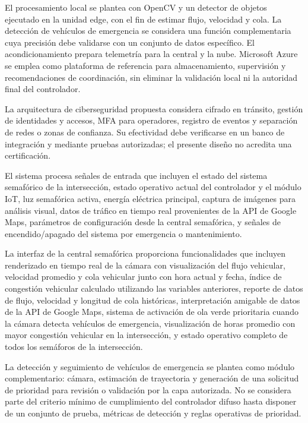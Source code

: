 \documentclass[12pt,a4paper,oneside]{report}
\begin{document}
El procesamiento local se plantea con OpenCV y un detector de objetos ejecutado en la unidad edge, con el fin de estimar flujo, velocidad y cola. La detección de vehículos de emergencia se considera una función complementaria cuya precisión debe validarse con un conjunto de datos específico. El acondicionamiento prepara telemetría para la central y la nube. Microsoft Azure se emplea como plataforma de referencia para almacenamiento, supervisión y recomendaciones de coordinación, sin eliminar la validación local ni la autoridad final del controlador.

La arquitectura de ciberseguridad propuesta considera cifrado en tránsito, gestión de identidades y accesos, MFA para operadores, registro de eventos y separación de redes o zonas de confianza. Su efectividad debe verificarse en un banco de integración y mediante pruebas autorizadas; el presente diseño no acredita una certificación.

El sistema procesa señales de entrada que incluyen el estado del sistema semafórico de la intersección, estado operativo actual del controlador y el módulo IoT, luz semafórica activa, energía eléctrica principal, captura de imágenes para análisis visual, datos de tráfico en tiempo real provenientes de la API de Google Maps, parámetros de configuración desde la central semafórica, y señales de encendido/apagado del sistema por emergencia o mantenimiento.

La interfaz de la central semafórica proporciona funcionalidades que incluyen renderizado en tiempo real de la cámara con visualización del flujo vehicular, velocidad promedio y cola vehicular junto con hora actual y fecha, índice de congestión vehicular calculado utilizando las variables anteriores, reporte de datos de flujo, velocidad y longitud de cola históricas, interpretación amigable de datos de la API de Google Maps, sistema de activación de ola verde prioritaria cuando la cámara detecta vehículos de emergencia, visualización de horas promedio con mayor congestión vehicular en la intersección, y estado operativo completo de todos los semáforos de la intersección.

La detección y seguimiento de vehículos de emergencia se plantea como módulo complementario: cámara, estimación de trayectoria y generación de una solicitud de prioridad para revisión o validación por la capa autorizada. No se considera parte del criterio mínimo de cumplimiento del controlador difuso hasta disponer de un conjunto de prueba, métricas de detección y reglas operativas de prioridad.
\end{document}
